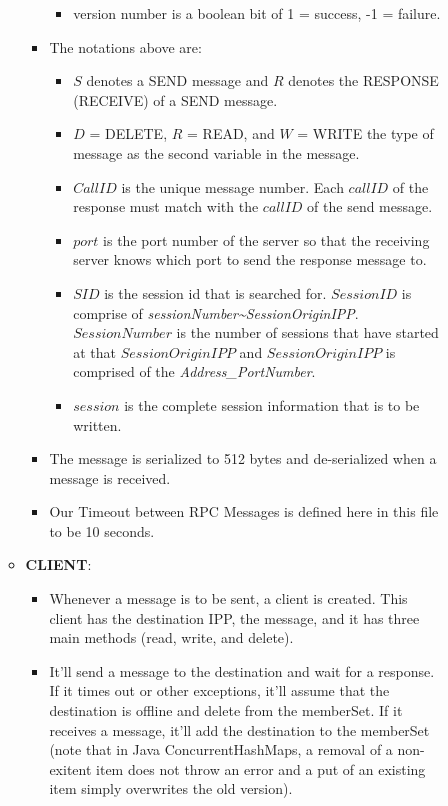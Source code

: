 \documentclass{article}
\begin{document}
\begin{description}
\begin{itemize}
\begin{itemize}
\begin{itemize}
\begin{itemize}
		    \item version number is a boolean bit of 1 = success, -1 = failure.
                  \end{itemize}
                \item The notations above are:
                  \begin{itemize}
                    \item $S$ denotes a SEND message and $R$ denotes the RESPONSE (RECEIVE) of a SEND message.
                    \item $D$ = DELETE, $R$ = READ, and $W$ = WRITE the type of message as the second variable in the message.
                    \item $CallID$ is the unique message number. Each $callID$ of the response must match with the $callID$ of the send message.
                    \item $port$ is the port number of the server so that the receiving server knows which port to send the response message to.
                    \item $SID$ is the session id that is searched for. $SessionID$ is comprise of \emph{sessionNumber\textasciitilde{}SessionOriginIPP}. $SessionNumber$ is the number of sessions that have started at that $SessionOriginIPP$ and $SessionOriginIPP$ is comprised of the \emph{Address\_PortNumber}.
                    \item $session$ is the complete session information that is to be written.
                  \end{itemize}
		\item The message is serialized to 512 bytes and de-serialized when a message is received.
		\item Our Timeout between RPC Messages is defined here in this file to be 10 seconds.
              \end{itemize}
            \item \textbf{CLIENT}:
              \begin{itemize} 
                \item Whenever a message is to be sent, a client is created. This client has the destination IPP, the message, and it has three main methods (read, write, and delete). 
                \item It'll send a message to the destination and wait for a response. If it times out or other exceptions, it'll assume that the destination is offline and delete from the memberSet. If it receives a message, it'll add the destination to the memberSet (note that in Java ConcurrentHashMaps, a removal of a non-exitent item does not throw an error and a put of an existing item simply overwrites the old version). 

\end{itemize}
\end{itemize}
\end{itemize}
\end{description}
\end{document}
